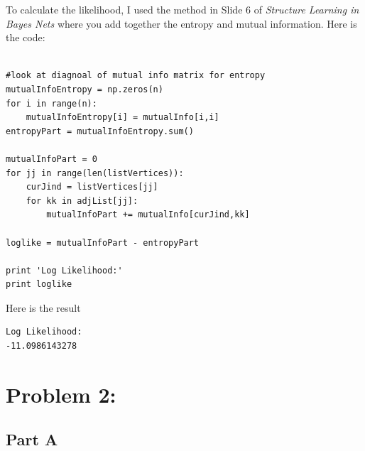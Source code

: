 \documentclass[twoside,11pt]{article}
\theoremstyle{definition}
\begin{document}
To calculate the likelihood, I used the method in Slide 6 of \textit{Structure Learning in Bayes Nets} where you add together the entropy and mutual information. Here is the code:
\begin{lstlisting}

#look at diagnoal of mutual info matrix for entropy
mutualInfoEntropy = np.zeros(n)
for i in range(n):
    mutualInfoEntropy[i] = mutualInfo[i,i]
entropyPart = mutualInfoEntropy.sum()

mutualInfoPart = 0
for jj in range(len(listVertices)):
    curJind = listVertices[jj]
    for kk in adjList[jj]:
        mutualInfoPart += mutualInfo[curJind,kk]

loglike = mutualInfoPart - entropyPart

print 'Log Likelihood:'
print loglike
\end{lstlisting}

Here is the result
\begin{lstlisting}
Log Likelihood:
-11.0986143278
\end{lstlisting}

\section*{Problem 2:}

\subsection*{Part A}

\begin{lstlisting}
\end{lstlisting}
\end{document}
